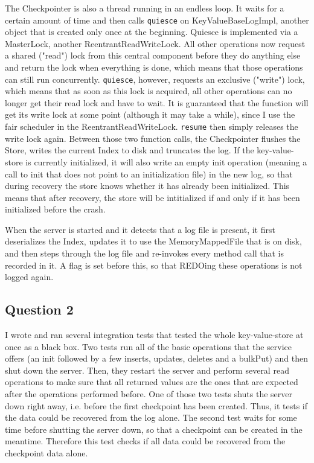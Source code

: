 \documentclass[12pt,a4paper]{article}
\begin{document}
The Checkpointer is also a thread running in an endless loop. It waits for a certain amount of time and then calls \texttt{quiesce} on KeyValueBaseLogImpl, another object that is created only once at the beginning. Quiesce is implemented via a MasterLock, another ReentrantReadWriteLock. All other operations now request a shared ("read") lock from this central component before they do anything else and return the lock when everything is done, which means that those operations can still run concurrently. \texttt{quiesce}, however, requests an exclusive ("write") lock, which means that as soon as this lock is acquired, all other operations can no longer get their read lock and have to wait. It is guaranteed that the function will get its write lock at some point (although it may take a while), since I use the fair scheduler in the ReentrantReadWriteLock. \texttt{resume} then simply releases the write lock again. Between those two function calls, the Checkpointer flushes the Store, writes the current Index to disk and truncates the log. If the key-value-store is currently initialized, it will also write an empty init operation (meaning a call to init that does not point to an initialization file) in the new log, so that during recovery the store knows whether it has already been initialized. This means that after recovery, the store will be intitialized if and only if it has been initialized before the crash.

When the server is started and it detects that a log file is present, it first deserializes the Index, updates it to use the MemoryMappedFile that is on disk, and then steps through the log file and re-invokes every method call that is recorded in it. A flag is set before this, so that REDOing these operations is not logged again.


\subsection*{Question 2}
\label{sec:pq2}
I wrote and ran several integration tests that tested the whole key-value-store at once as a black box. Two tests run all of the basic operations that the service offers (an init followed by a few inserts, updates, deletes and a bulkPut) and then shut down the server. Then, they restart the server and perform several read operations to make sure that all returned values are the ones that are expected after the operations performed before. One of those two tests shuts the server down right away, i.e. before the first checkpoint has been created. Thus, it tests if the data could be recovered from the log alone. The second test waits for some time before shutting the server down, so that a checkpoint can be created in the meantime. Therefore this test checks if all data could be recovered from the checkpoint data alone.
\end{document}
